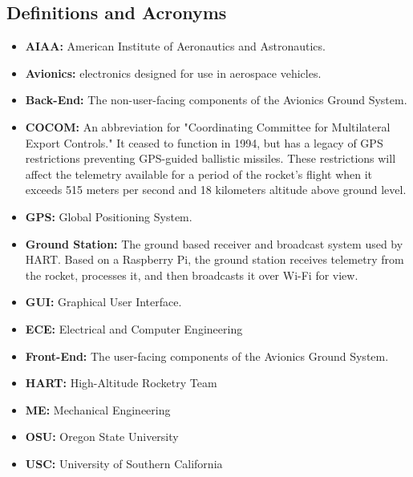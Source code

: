 \documentclass[journal,10pt,onecolumn,compsoc]{IEEEtran}
\begin{document}
	\subsection{Definitions and Acronyms}
	\begin{itemize}
		\item \textbf{AIAA:}
			American Institute of Aeronautics and Astronautics. \\
		
		\item \textbf{Avionics:}
			electronics designed for use in aerospace vehicles. \\
		
		\item \textbf{Back-End:}
			The non-user-facing components of the Avionics Ground System. \\
		
		\item \textbf{COCOM:}
			An abbreviation for "Coordinating Committee for Multilateral Export Controls."
			It ceased to function in 1994, but has a legacy of GPS restrictions preventing GPS-guided ballistic missiles.
			These restrictions will affect the telemetry available for a period of the rocket's flight when it exceeds 515 meters per second and 18 kilometers altitude above ground level. \\
		
		\item \textbf{GPS:}
			Global Positioning System. \\
		
		\item \textbf{Ground Station:}
			The ground based receiver and broadcast system used by HART. 
			Based on a Raspberry Pi, the ground station receives telemetry from the rocket, processes it, and then broadcasts it over Wi-Fi for view. \\
		
		\item \textbf{GUI:}
			Graphical User Interface. \\
		
		\item \textbf{ECE:}
			Electrical and Computer Engineering \\
		
		\item \textbf{Front-End:}
			The user-facing components of the Avionics Ground System. \\
		
		\item \textbf{HART:}
			High-Altitude Rocketry Team \\
		
		\item \textbf{ME:}
			Mechanical Engineering	\\
		
		\item \textbf{OSU:}
			Oregon State University \\
		
		\item \textbf{USC:}
			University of Southern California \\
	
	\end{itemize}
\end{document}
